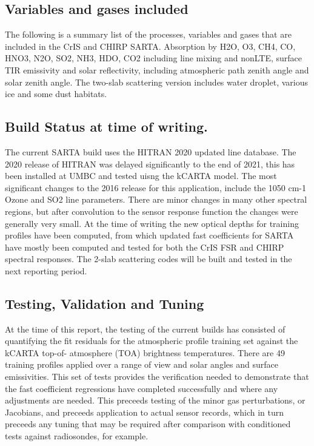 \documentclass[11pt,twocolumn]{article}
\begin{document}
\subsection{Variables and gases included}
\label{sec:org2c23c72}

The following is a summary list of the processes, variables and gases
that are included in the CrIS and CHIRP SARTA.
Absorption by H2O, O3, CH4, CO, HNO3, N2O, SO2, NH3, HDO, CO2 including line mixing and nonLTE,
surface TIR emissivity and solar reflectivity, including atmospheric path zenith angle
and solar zenith angle. The two-slab scattering version includes water droplet, various
ice and some dust habitats.

\subsection{Build Status at time of writing.}
\label{sec:org4d8fceb}

The current SARTA build uses the HITRAN 2020 updated line database.
The 2020 release of HITRAN was delayed significantly
to the end of 2021, this has been installed at UMBC and tested uisng the kCARTA
model. The most significant changes to the 2016 release for this application, include the
1050 cm-1 Ozone and SO2 line parameters. There are minor changes
in many other spectral regions, but after convolution to the sensor response function
the changes were generally very small. At the time of writing the new optical depths for
training profiles have been computed, from which updated fast coefficients for SARTA have mostly
been computed and tested for both the CrIS FSR and CHIRP spectral responses. The 2-slab
scattering codes will be built and tested in the next reporting period. 


\subsection{Testing, Validation and Tuning}
\label{sec:orgf433996}

At the time of this report, the testing of the current builds has consisted of quantifying
the fit residuals for the atmospheric profile training set against the kCARTA top-of-
atmosphere (TOA) brightness temperatures. There are 49 training profiles applied over a
range of view and solar angles and surface emissivities. This set of tests provides the
verification needed to demonstrate that the fast coefficient regressions have completed
successfully and where any adjustments are needed. This preceeds testing of the minor gas
perturbations, or Jacobians, and preceeds application to actual sensor records, which
in turn preceeds any tuning that may be required after comparison with conditioned tests
against radiosondes, for example.
\end{document}
